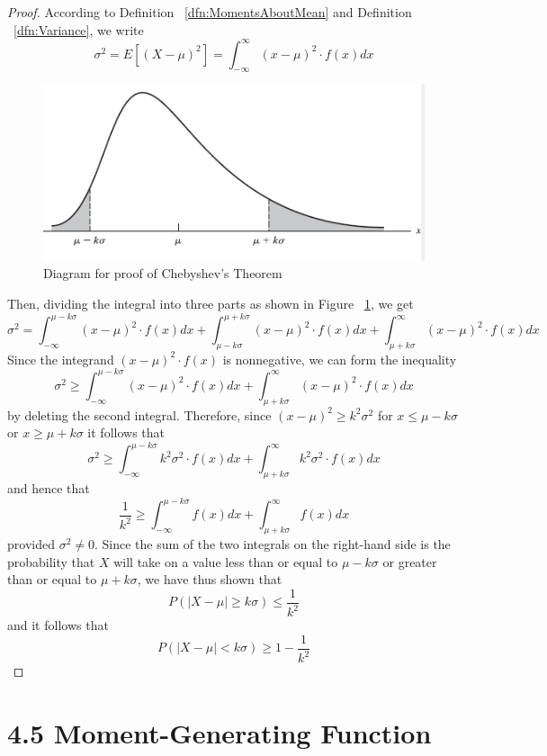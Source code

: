 \documentclass[
10pt,reqno
]{amsart}
\theoremstyle{definition}
\begin{document}
\begin{proof}
According to Definition ~\ref{dfn:MomentsAboutMean} and Definition ~\ref{dfn:Variance}, we write
\[
\sigma^2 = E[(X-\mu)^2] = \int_{-\infty}^{\infty}(x-\mu)^2 \cdot f(x) dx
\]
\begin{figure}[h]
\includegraphics[width=1\textwidth]{ChebyshevsTheorem}
\caption{Diagram for proof of Chebyshev's Theorem}
\label{fig:Chebyshev}
\end{figure}

Then, dividing the integral into three parts as shown in Figure ~\ref{fig:Chebyshev}, we get
\[
\sigma^2 = \int_{- \infty}^{\mu - k \sigma}(x - \mu)^2 \cdot f(x) dx +
\int_{\mu - k \sigma}^{\mu + k \sigma}(x - \mu)^2 \cdot f(x) dx +
\int_{\mu + k \sigma}^{\infty}(x - \mu)^2 \cdot f(x) dx
\]
Since the integrand \((x - \mu)^2 \cdot f(x) \) is nonnegative, we can form the inequality
\[
\sigma^2 \ge \int_{- \infty}^{\mu - k \sigma}(x - \mu)^2 \cdot f(x) dx +
\int_{\mu + k \sigma}^{\infty}(x - \mu)^2 \cdot f(x) dx
\]
by deleting the second integral. Therefore, since \((x-\mu)^2 \ge k^2 \sigma ^2\) for \(x \le \mu - k\sigma \) or \(x \ge \mu + k \sigma \) it follows that
\[
\sigma^2 \ge \int_{- \infty}^{\mu - k \sigma} k^2 \sigma^2 \cdot f(x) dx +
\int_{\mu + k \sigma}^{\infty}k^2 \sigma^2 \cdot f(x) dx
\]
and hence that
\[
\frac{1}{k^2} \ge \int_{- \infty}^{\mu -k \sigma} f(x) dx +
\int_{\mu + k \sigma}^{\infty} f(x) dx
\]
provided \(\sigma^2 \ne 0\). Since the sum of the two integrals on the right-hand side is the probability that \(X\) will take on a value less than or equal to \(\mu - k \sigma \) or greater than or equal to \( \mu +k \sigma\), we have thus shown that 
\[
P(|X-\mu| \ge k \sigma) \le \frac{1}{k^2}
\]
and it follows that
\[
P(|X-\mu| < k \sigma) \ge 1 - \frac{1}{k^2}
\]
\end{proof}

\newpage

\section*{4.5 Moment-Generating Function}
\end{document}
